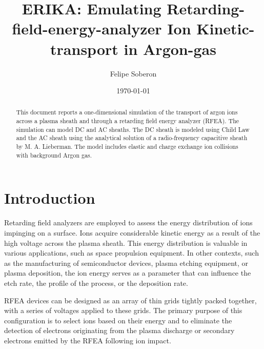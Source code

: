 \documentclass[%
 aapm,
 mph,%
 amsmath,amssymb,
 reprint,%
]{revtex4-2}
\begin{document}

\title[Ion transport in a RFEA]{ERIKA: Emulating Retarding-field-energy-analyzer Ion Kinetic-transport in Argon-gas}

\author{Felipe Soberon}

\date{\today}%

\begin{abstract}
This document reports a one-dimensional simulation of the transport of argon ions across a plasma sheath and through a
retarding field energy analyzer (RFEA). The simulation can model DC and AC sheaths. The DC sheath is modeled using Child Law
and the AC sheath using the analytical solution of a radio-frequency capacitive sheath by M. A. Lieberman. The model includes
elastic and charge exchange ion collisions with background Argon gas. 
\end{abstract}

\maketitle


\section{\label{Introduction}Introduction}

Retarding field analyzers are employed to assess the energy distribution of ions impinging on a surface. Ions acquire considerable kinetic energy as a result of the high voltage across the plasma sheath. This energy distribution is valuable in various applications, such as space propulsion equipment. In other contexts, such as the manufacturing of semiconductor devices, plasma etching equipment, or plasma deposition, the ion energy serves as a parameter that can influence the etch rate, the profile of the process, or the deposition rate.

RFEA devices can be designed as an array of thin grids tightly packed together, with a series of voltages applied to these grids. The primary purpose of this configuration is to select ions based on their energy and to eliminate the detection of electrons originating from the plasma discharge or secondary electrons emitted by the RFEA following ion impact. 
\end{document}
